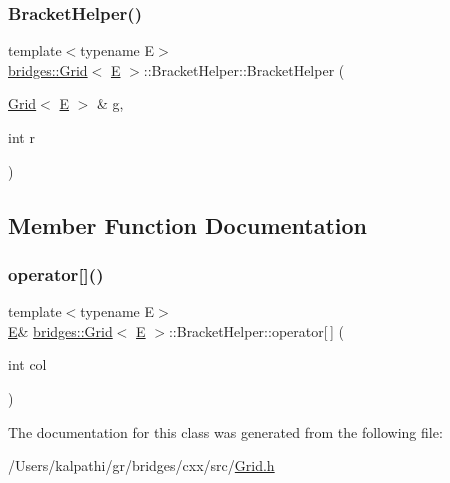 \subsubsection{\texorpdfstring{BracketHelper()}{BracketHelper()}}
{\footnotesize\ttfamily template$<$typename E$>$ \\
\mbox{\hyperlink{classbridges_1_1_grid}{bridges\+::\+Grid}}$<$ \mbox{\hyperlink{namespacebridges_acfb0a4f7877d8f63de3e6862004c50eda3a3ea00cfc35332cedf6e5e9a32e94da}{E}} $>$\+::Bracket\+Helper\+::\+Bracket\+Helper (\begin{DoxyParamCaption}\item[{\mbox{\hyperlink{classbridges_1_1_grid}{Grid}}$<$ \mbox{\hyperlink{namespacebridges_acfb0a4f7877d8f63de3e6862004c50eda3a3ea00cfc35332cedf6e5e9a32e94da}{E}} $>$ \&}]{g,  }\item[{int}]{r }\end{DoxyParamCaption})\hspace{0.3cm}{\ttfamily [inline]}}



\subsection{Member Function Documentation}
\mbox{\label{classbridges_1_1_grid_1_1_bracket_helper_ad8055b8dd94d6988d8143ab7cf7d3386}} 
\subsubsection{\texorpdfstring{operator[]()}{operator[]()}}
{\footnotesize\ttfamily template$<$typename E$>$ \\
\mbox{\hyperlink{namespacebridges_acfb0a4f7877d8f63de3e6862004c50eda3a3ea00cfc35332cedf6e5e9a32e94da}{E}}\& \mbox{\hyperlink{classbridges_1_1_grid}{bridges\+::\+Grid}}$<$ \mbox{\hyperlink{namespacebridges_acfb0a4f7877d8f63de3e6862004c50eda3a3ea00cfc35332cedf6e5e9a32e94da}{E}} $>$\+::Bracket\+Helper\+::operator\mbox{[}$\,$\mbox{]} (\begin{DoxyParamCaption}\item[{int}]{col }\end{DoxyParamCaption})\hspace{0.3cm}{\ttfamily [inline]}}



The documentation for this class was generated from the following file\+:\begin{DoxyCompactItemize}
\item 
/\+Users/kalpathi/gr/bridges/cxx/src/\mbox{\hyperlink{_grid_8h}{Grid.\+h}}\end{DoxyCompactItemize}
